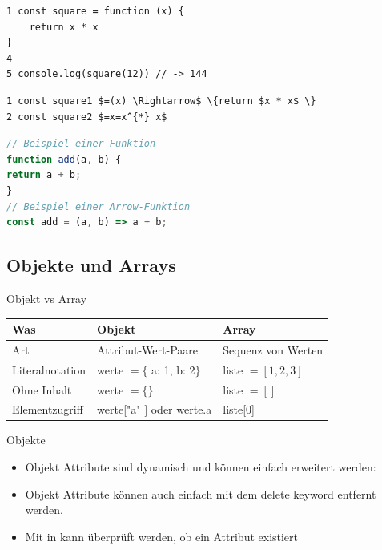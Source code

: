 \begin{verbatim}
1 const square = function (x) {
    return x * x
}
4
5 console.log(square(12)) // -> 144
\end{verbatim}

\begin{verbatim}
1 const square1 $=(x) \Rightarrow$ \{return $x * x$ \}
2 const square2 $=x=x^{*} x$
\end{verbatim}

\begin{lstlisting}[language=JavaScript, style=base]
// Beispiel einer Funktion
function add(a, b) {
return a + b;
}
// Beispiel einer Arrow-Funktion
const add = (a, b) => a + b;
\end{lstlisting}

\subsection{Objekte und Arrays}

\begin{concept}{Objekt vs Array}
    \begin{tabular}{|l|l|l|}
        \hline
        Was & Objekt & Array \\
        \hline
        Art & Attribut-Wert-Paare & Sequenz von Werten \\
        \hline
        Literalnotation & werte $=\{$ a: 1, b: 2$\}$ & liste $=[1,2,3]$ \\
        \hline
        Ohne Inhalt & werte $=\{ \}$ & liste $=[]$ \\
        \hline
        Elementzugriff & werte["a" $]$ oder werte.a & liste[0] \\
        \hline
        \end{tabular}
\end{concept}

\begin{definition}{Objekte}
    \begin{itemize}
        \item Objekt Attribute sind dynamisch und können einfach erweitert werden:
        \item Objekt Attribute können auch einfach mit dem delete keyword entfernt werden.
        \item Mit in kann überprüft werden, ob ein Attribut existiert
    \end{itemize}
\end{definition}


